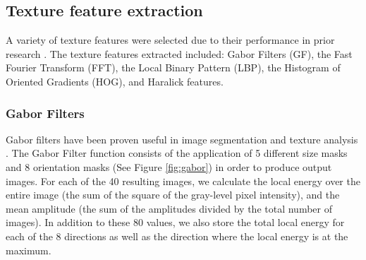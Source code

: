 \subsection{Texture feature extraction}

A variety of texture features were selected due to their performance in prior research \cite{RodriguezDamian_2006,Redondo_2015,Maillard_2003,Marcos_2015}.
The texture features extracted included: Gabor Filters (GF), the Fast Fourier Transform (FFT), the Local Binary Pattern (LBP), the Histogram of Oriented Gradients (HOG), and Haralick features.

\subsubsection{Gabor Filters}

Gabor filters have been proven useful in image segmentation and texture analysis \cite{Zheng_2004}. The Gabor Filter function consists of the application of 5 different size masks and 8 orientation masks (See Figure \ref{fig:gabor}) in order to produce output images. For each of the 40 resulting images, we calculate the local energy over the entire image (the sum of the square of the gray-level pixel intensity), and the mean amplitude (the sum of the amplitudes divided by the total number of images). In addition to these 80 values, we also store the total local energy for each of the 8 directions as well as the direction where the local energy is at the maximum.

  
  
  
  
  
  
  
  
  
  
  
  